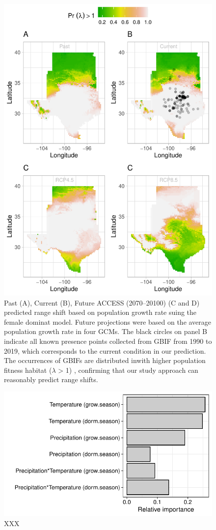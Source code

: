 \documentclass[12pt]{article}
\begin{document}
\begin{figure}[H]
  \begin{center}
    \includegraphics[width=0.78\linewidth]{Figures/Fig_geoPrlambdaprojection_fd_acc.pdf}
  \caption{Past (A), Current (B), Future ACCESS (2070–20100) (C and D) predicted range shift based on population growth rate suing the female dominat model. Future projections were based on the average population growth rate in four GCMs. The black circles on panel B indicate all known presence points collected from GBIF from 1990 to 2019, which corresponds to the current condition in our prediction.  The occurrences of GBIFs are distributed inwith higher population fitness habitat ($\lambda$ > 1) , confirming that our study approach can reasonably predict range shifts. }
  \label{fig:geoproj}
  \end{center}
\end{figure}

\begin{figure}[H]
  \begin{center}
    \includegraphics[width=0.85\linewidth]{Figures/Fig_LTRE.pdf}
  \caption{XXX}
  \label{Sup:LTRE}
  \end{center}
\end{figure}
\end{document}
